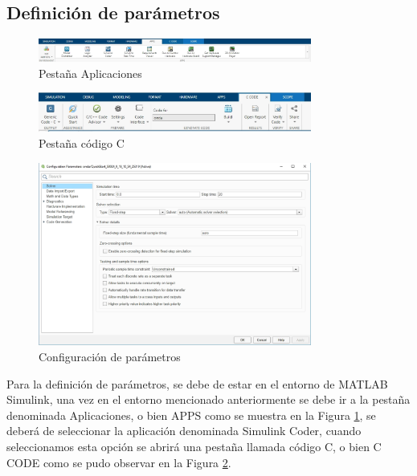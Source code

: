 \subsection{Definición de parámetros}

\begin{figure}[h!]
    \centering
    \includegraphics[width=0.8\textwidth]{fig/especifico_2/paso_a_paso_mtmt/apps.png}
    \caption{Pestaña Aplicaciones}
    \label{fig:pestana_apps}
\end{figure}

\begin{figure}[h!]
    \centering
    \includegraphics[width=0.8\textwidth]{fig/especifico_2/paso_a_paso_mtmt/c_code.png}
    \caption{Pestaña código C}
    \label{fig:pestana_c_code}
\end{figure}

\begin{figure}[h!]
    \centering
    \includegraphics[width=0.8\textwidth]{fig/especifico_2/paso_a_paso_mtmt/configuration_parameters.png}
    \caption{Configuración de parámetros}
    \label{fig:pestana_config}
\end{figure}

Para la definición de parámetros, se debe de estar en el entorno de MATLAB Simulink, una vez en el entorno mencionado anteriormente se debe ir a la pestaña denominada Aplicaciones, o bien APPS como se muestra en la Figura \ref{fig:pestana_apps}, se deberá de seleccionar la aplicación denominada Simulink Coder, cuando seleccionamos esta opción se abrirá una pestaña llamada código C, o bien C CODE como se pudo observar en la Figura \ref{fig:pestana_c_code}.

